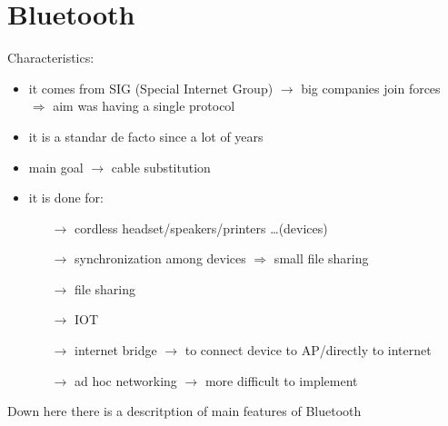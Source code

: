 \section{Bluetooth}
Characteristics:
\begin{itemize}
    \item it comes from SIG (Special Internet Group) $\rightarrow$ big companies join forces\\
    $\Rightarrow$ aim was having a single protocol
    \item it is a standar de facto since a lot of years
    \item main goal $\rightarrow$ cable substitution
    \item it is done for:
    \begin{itemize}
        \item[$\rightarrow$] cordless headset/speakers/printers \dots (devices)
        \item[$\rightarrow$] synchronization among devices $\Rightarrow$ small file sharing
        \item[$\rightarrow$] file sharing
        \item[$\rightarrow$] IOT
        \item[$\rightarrow$] internet bridge $\rightarrow$ to connect device to AP/directly to internet 
        \item[$\rightarrow$] ad hoc networking $\rightarrow$ more difficult to implement 
    \end{itemize}
\end{itemize}
Down here there is a descritption of main features of Bluetooth
